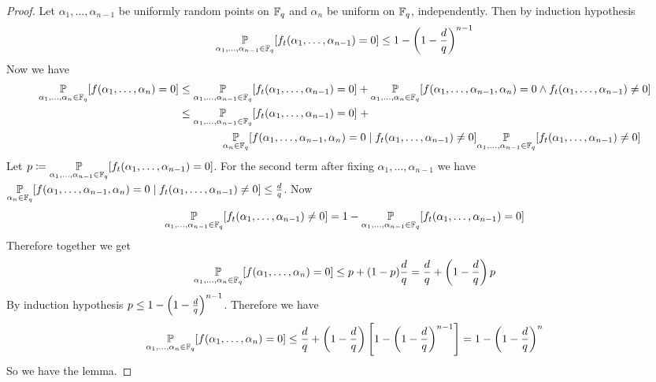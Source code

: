 \begin{proof}
  Let $\alpha_1,\dots,\alpha_{n-1}$ be uniformly random points on $\mathbb{F}_q$ and $\alpha_n$ be uniform on $\mathbb{F}_q$, independently. Then by induction hypothesis $$\Pr[\alpha_1,\dots,\alpha_{n-1}\in\bbF_q] [f_t(\alpha_1,\dots,\alpha_{n-1})=0]\leq 1-\lt(1-\frac{d}{q}\rt)^{n-1}$$Now we have \begin{align*}
    \underset{\alpha_1,\dots,\alpha_n\in\mathbb{F}_q}{\mathbb{P}} [f(\alpha_1,\dots,\alpha_n)=0] &\leq \underset{\alpha_1,\dots,\alpha_{n-1}\in\mathbb{F}_q}{\mathbb{P}} [f_t(\alpha_1,\dots,\alpha_{n-1})=0]+ \underset{\alpha_1,\dots,\alpha_n\in\mathbb{F}_q}{\mathbb{P}} [f(\alpha_1,\dots, \alpha_{n-1},\alpha_n)=0\wedge f_t(\alpha_1,\dots,\alpha_{n-1})\neq 0]\\ 
    & \leq \underset{\alpha_1,\dots,\alpha_{n-1}\in\mathbb{F}_q}{\mathbb{P}} [f_t(\alpha_1,\dots,\alpha_{n-1})=0]\;+ \\ 
    &\qquad\qquad \underset{\alpha_n\in\mathbb{F}_q}{\mathbb{P}} [f(\alpha_1,\dots, \alpha_{n-1},\alpha_n)=0\mid f_t(\alpha_1,\dots,\alpha_{n-1})\neq 0]\underset{\alpha_1,\dots,\alpha_{n-1}\in\mathbb{F}_q}{\mathbb{P}}[f_t(\alpha_1,\dots,\alpha_{n-1})\neq 0]
  \end{align*}
  Let $p\coloneqq \underset{\alpha_1,\dots,\alpha_{n-1}\in\mathbb{F}_q}{\mathbb{P}} [f_t(\alpha_1,\dots,\alpha_{n-1})=0]$. For the second term after fixing $\alpha_1,\dots,\alpha_{n-1}$ we have $\underset{\alpha_n\in\mathbb{F}_q}{\mathbb{P}} [f(\alpha_1,\dots, \alpha_{n-1},\alpha_n)=0\mid f_t(\alpha_1,\dots,\alpha_{n-1})\neq 0]\leq\frac{d}q$. Now $$\underset{\alpha_1,\dots,\alpha_{n-1}\in\mathbb{F}_q}{\mathbb{P}}[f_t(\alpha_1,\dots,\alpha_{n-1})\neq 0]=1-\underset{\alpha_1,\dots,\alpha_{n-1}\in\mathbb{F}_q}{\mathbb{P}}[f_t(\alpha_1,\dots,\alpha_{n-1})= 0]$$ Therefore together we get $$\underset{\alpha_1,\dots,\alpha_n\in\mathbb{F}_q}{\mathbb{P}} [f(\alpha_1,\dots,\alpha_n)=0]\leq p+(1-p)\frac{d}{q}=\frac{d}{q}+\left(1-\frac{d}{q}\right)p$$By induction hypothesis $p\leq 1-\left(1-\frac{d}q\right)^{n-1}$. Therefore we have $$\underset{\alpha_1,\dots,\alpha_n\in\mathbb{F}_q}{\mathbb{P}} [f(\alpha_1,\dots,\alpha_n)=0]\leq \frac{d}{q}+\left(1-\frac{d}{q}\right)\left[1-\left(1-\frac{d}{q}\right)^{n-1}\right]=1-\left(1-\frac{d}{q}\right)^{n}$$So we have the lemma. 
\end{proof}

